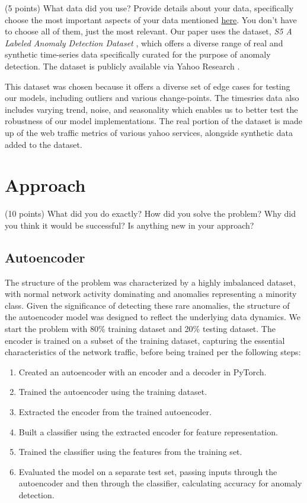 \documentclass[10pt,twocolumn,letterpaper]{article}
\begin{document}
(5 points) What data did you use? Provide details about your data, specifically choose the most important aspects of your data mentioned \href{https://arxiv.org/abs/1803.09010}{here}. You don’t have to choose all of them, just the most relevant.
Our paper uses the dataset, \textit{S5 A Labeled Anomaly Detection Dataset} \cite{yahooS5}, which offers a diverse range of real and synthetic time-series data specifically
curated for the purpose of anomaly detection. The dataset is publicly available via Yahoo Research \cite{yahooS5}.

This dataset was chosen because it offers a diverse set of edge cases for testing our models, including outliers and various change-points. The timesries data also includes varying trend, noise, and seasonality 
which enables us to better test the robustness of our model implementations. The real portion of the dataset is made up of the web traffic metrics of various yahoo services, alongside synthetic data added to the dataset. 
\section{Approach}

(10 points) What did you do exactly? How did you solve the problem? Why did you think it would be successful? Is anything new in your approach? 
\subsection{Autoencoder}
The structure of the problem was characterized by a highly imbalanced dataset, with normal network activity dominating and anomalies representing a minority class. 
Given the significance of detecting these rare anomalies, the structure of the autoencoder model was designed to reflect the underlying data dynamics. 
We start the problem with 80\% training dataset and 20\% testing dataset. The encoder is trained on a subset of the training dataset, capturing the essential characteristics of the network traffic, before being trained 
per the following steps:


\begin{enumerate}
    \item Created an autoencoder with an encoder and a decoder in PyTorch.
    \item Trained the autoencoder using the training dataset.
    \item Extracted the encoder from the trained autoencoder.
    \item Built a classifier using the extracted encoder for feature representation.
    \item Trained the classifier using the features from the training set.
    \item Evaluated the model on a separate test set, passing inputs through the autoencoder and then through the classifier, calculating accuracy for anomaly detection.
\end{enumerate}
\end{document}
